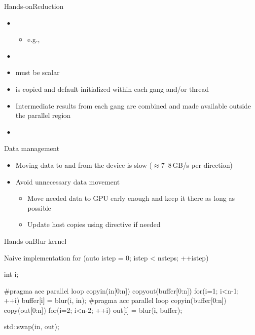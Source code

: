 \documentclass[12pt,aspectratio=169]{beamer}
\begin{document}
\begin{frame}{Hands-on}{Reduction}
  \begin{itemize}
  \item {}
    \begin{itemize}
    \item e.g., 
    \end{itemize}
  \item {}
  \item {} must be scalar
  \item {} is copied and default initialized within each gang
    and/or thread
  \item Intermediate results from each gang are combined and made available
    outside the parallel region
  \item {}
  \end{itemize}
\end{frame}

\begin{frame}{Data management}
  \begin{itemize}
  \item Moving data to and from the device is slow ($\approx$7--8\,GB/s per
    direction)
  \item Avoid unnecessary data movement
    \begin{itemize}
    \item Move needed data to GPU early enough and keep it there as long as
      possible
    \item Update host copies using  directive
      if needed
    \end{itemize}
  \end{itemize}
\end{frame}

\begin{frame}[fragile]{Hands-on}{Blur kernel}
  \begin{Cpplisting}{Naive implementation}
for (auto istep = 0; istep < nsteps; ++istep) {
    int i;

    #pragma acc parallel loop copyin(in[0:n]) copyout(buffer[0:n])
    for(i=1; i<n-1; ++i) {
        buffer[i] = blur(i, in);
    }
    #pragma acc parallel loop copyin(buffer[0:n]) copy(out[0:n])
    for(i=2; i<n-2; ++i) {
        out[i] = blur(i, buffer);
    }

    std::swap(in, out);
}
  \end{Cpplisting}
\end{frame}
\end{document}
